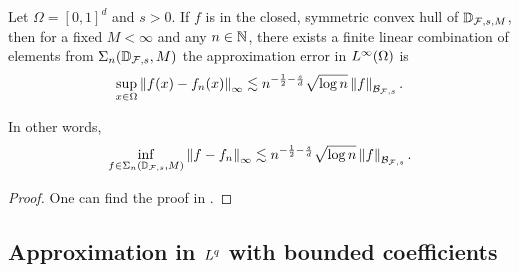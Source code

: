 \begin{theorem}
    Let $\Omega = [0,1]^d$ and $s > 0$. If $f$ is in the closed, symmetric
    convex hull of $\mathbb{D}_{\mathcal{F}, s, M}$, then for a fixed $M<\infty$
    and any $n \in \mathbb{N}$, there exists a finite linear combination of elements
    from $\Sigma_n(\mathbb{D}_{\mathcal{F}, s}, M)$ the approximation error in
    $L^{\infty}(\Omega)$ is
    \begin{equation}
        \sup_{x\in \Omega} \left\| f(x)-f_n(x) \right\|_{\infty} \lesssim 
        n^{-\frac{1}{2}-\frac{s}{d}} \sqrt{\log{n}} \left\| f \right\|_{\mathcal{B}_{\mathcal{F},s}}.
    \end{equation}

    In other words,
    \begin{equation}
        \inf_{f\in \Sigma_n(\mathbb{D}_{\mathcal{F}, s}, M)} 
        \left\| f-f_n \right\|_{\infty} \lesssim 
        n^{-\frac{1}{2}-\frac{s}{d}} \sqrt{\log{n}} \left\| f \right\|_{\mathcal{B}_{\mathcal{F},s}}.
    \end{equation}
\end{theorem}

\begin{proof}
    One can find the proof in
    \cite{klusowskiApproximationCombinationsReLU2018,siegelSharpBoundsApproximation2022}.
\end{proof}

\subsection{Approximation in $L^{q}$ with bounded coefficients}




